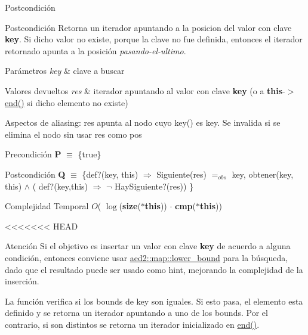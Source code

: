 \begin{DoxyPostcond}{\-Postcondición}
\begin{DoxyPostcond}{\-Postcondición}
Retorna un iterador apuntando a la posicion del valor con clave {\bfseries key}. Si dicho valor no existe, porque la clave no fue definida, entonces el iterador retornado apunta a la posición {\itshape pasando-\/el-\/ultimo}.


\begin{DoxyParams}{Parámetros}
{\em key} & clave a buscar \\
\hline
\end{DoxyParams}

\begin{DoxyRetVals}{Valores devueltos}
{\em res} & iterador apuntando al valor con clave {\bfseries key} (o a {\bfseries this}-\/$>$\hyperlink{classaed2_1_1map_a76023e6a56cb625513e1b5ea028bf983_a76023e6a56cb625513e1b5ea028bf983}{end()} si dicho elemento no existe)\\
\hline
\end{DoxyRetVals}
\begin{DoxyParagraph}{Aspectos de aliasing\+:}
res apunta al nodo cuyo key() es key. Se invalida si se elimina el nodo sin usar res como pos
\end{DoxyParagraph}
\begin{DoxyPrecond}{Precondición}
{\bfseries P} $\equiv$ \{true\} 
\end{DoxyPrecond}
\begin{DoxyPostcond}{Postcondición}
{\bfseries Q} $\equiv$ \{def?(key, this) $\Rightarrow$ Siguiente(res) $=_{obs}$  key, obtener(key, this)  $\land$ ( def?(key,this) $\Rightarrow$ $\lnot$ Hay\+Siguiente?(res)) \}
\end{DoxyPostcond}

\begin{DoxyDescription}
\item[Complejidad Temporal]$O$( $\log$({\bfseries size}({\bfseries $\ast$this})) $\cdot$ {\bfseries cmp}({\bfseries $\ast$this}))
\end{DoxyDescription}

<<<<<<< HEAD
\begin{DoxyAttention}{\-Atención}
\-Si el objetivo es insertar un valor con clave {\bfseries key} de acuerdo a alguna condición, entonces conviene usar \hyperlink{classaed2_1_1map_a3399d36fdd5a880b494f3a5795d3f18f_a3399d36fdd5a880b494f3a5795d3f18f}{aed2\-::map\-::lower\-\_\-bound} para la búsqueda, dado que el resultado puede ser usado como hint, mejorando la complejidad de la inserción.
\end{DoxyAttention}
\-La función verifica si los bounds de key son iguales. \-Si esto pasa, el elemento esta definido y se retorna un iterador apuntando a uno de los bounds. \-Por el contrario, si son distintos se retorna un iterador inicializado en \hyperlink{classaed2_1_1map_a76023e6a56cb625513e1b5ea028bf983_a76023e6a56cb625513e1b5ea028bf983}{end()}. 


\end{DoxyPostcond}
\end{DoxyPostcond}
